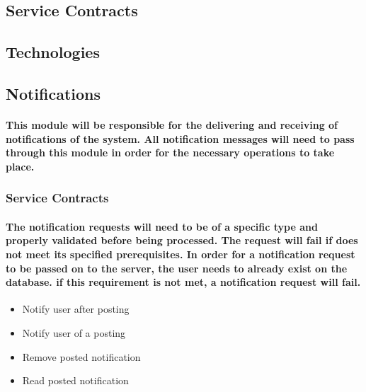 \documentclass[12pt]{article}
\begin{document}
\paragraph{}

\subsection{Service Contracts}
\paragraph{}
	 	 
\subsection{Technologies}
\paragraph{}
\subsection{Notifications}
\paragraph{This module will be responsible for the delivering and receiving of notifications of the system. All notification messages will need to pass through this module in order for the necessary operations to take place.}
\subsubsection{Service Contracts}
\paragraph{The notification requests will need to be of a specific type and properly validated before being processed. The request will fail if does not meet its specified prerequisites. In order for a notification request to be passed on to the server, the user needs to already exist on the database. if this requirement is not met, a notification request will fail.}
\begin{itemize}
\item Notify user after posting
\item Notify user of a posting
\item Remove posted notification 
\item Read posted notification
\end{itemize}
\end{document}
